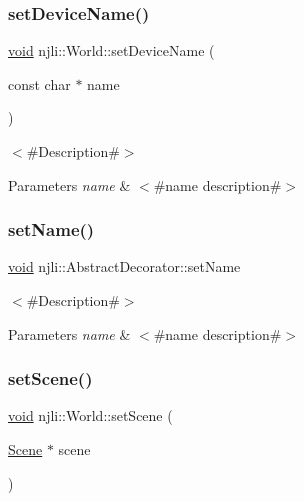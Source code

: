 \subsubsection{\texorpdfstring{set\+Device\+Name()}{setDeviceName()}}
{\footnotesize\ttfamily \mbox{\hyperlink{_thread_8h_af1e856da2e658414cb2456cb6f7ebc66}{void}} njli\+::\+World\+::set\+Device\+Name (\begin{DoxyParamCaption}\item[{const char $\ast$}]{name }\end{DoxyParamCaption})}

$<$\#\+Description\#$>$


\begin{DoxyParams}{Parameters}
{\em name} & $<$\#name description\#$>$ \\
\hline
\end{DoxyParams}
\mbox{\label{classnjli_1_1_world_a087eb5f8d9f51cc476f12f1d10a3cb95}} 
\subsubsection{\texorpdfstring{set\+Name()}{setName()}}
{\footnotesize\ttfamily \mbox{\hyperlink{_thread_8h_af1e856da2e658414cb2456cb6f7ebc66}{void}} njli\+::\+Abstract\+Decorator\+::set\+Name}

$<$\#\+Description\#$>$


\begin{DoxyParams}{Parameters}
{\em name} & $<$\#name description\#$>$ \\
\hline
\end{DoxyParams}
\mbox{\label{classnjli_1_1_world_a80c42c94ab3fbf4242f3d9b5e7866379}} 
\subsubsection{\texorpdfstring{set\+Scene()}{setScene()}}
{\footnotesize\ttfamily \mbox{\hyperlink{_thread_8h_af1e856da2e658414cb2456cb6f7ebc66}{void}} njli\+::\+World\+::set\+Scene (\begin{DoxyParamCaption}\item[{\mbox{\hyperlink{classnjli_1_1_scene}{Scene}} $\ast$}]{scene }\end{DoxyParamCaption})}

